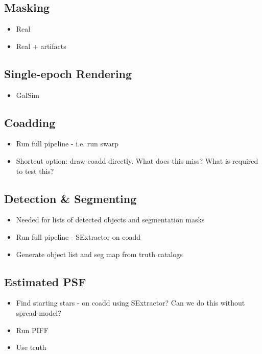 \documentclass[\docopts]{\docclass}
\begin{document}
\subsection{Masking}

\begin{itemize}
\item Real
\item Real + artifacts
\end{itemize}

\subsection{Single-epoch Rendering}

\begin{itemize}
\item GalSim
\end{itemize}

\subsection{Coadding}
\begin{itemize}
\item Run full pipeline - i.e. run swarp
\item Shortcut option: draw coadd directly. What does this miss? What is required to test this?
\end{itemize}

\subsection{Detection \& Segmenting}
\begin{itemize}
\item Needed for lists of detected objects and segmentation masks
\item Run full pipeline - SExtractor on coadd
\item Generate object list and seg map from truth catalogs
\end{itemize}

\subsection{Estimated PSF}
\begin{itemize}
<<<<<<< HEAD
\item Find starting stars - on coadd using SExtractor? Can we do this without spread-model?

\item Run PIFF
\item Use truth
\end{itemize}
\end{document}
